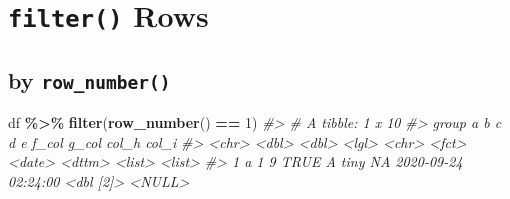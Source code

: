 \documentclass[
]{report}
\newenvironment{Shaded}{\begin{snugshade}}{\end{snugshade}}
\newcommand{\CommentTok}[1]{\textcolor[rgb]{0.56,0.35,0.01}{\textit{#1}}}
\newcommand{\DecValTok}[1]{\textcolor[rgb]{0.00,0.00,0.81}{#1}}
\newcommand{\KeywordTok}[1]{\textcolor[rgb]{0.13,0.29,0.53}{\textbf{#1}}}
\newcommand{\NormalTok}[1]{#1}
\newcommand{\OperatorTok}[1]{\textcolor[rgb]{0.81,0.36,0.00}{\textbf{#1}}}
\newcommand{\StringTok}[1]{\textcolor[rgb]{0.31,0.60,0.02}{#1}}
\begin{document}
\hypertarget{filter-rows}{%
\section{\texorpdfstring{\texttt{filter()} Rows}{filter() Rows}}\label{filter-rows}}

\hypertarget{by-row_number}{%
\subsection{\texorpdfstring{by \texttt{row\_number()}}{by row\_number()}}\label{by-row_number}}

\begin{Shaded}
\begin{Highlighting}[]
\NormalTok{df }\OperatorTok{\%\textgreater{}\%}
\StringTok{  }\KeywordTok{filter}\NormalTok{(}\KeywordTok{row\_number}\NormalTok{() }\OperatorTok{==}\StringTok{ }\DecValTok{1}\NormalTok{)}
\CommentTok{\#\textgreater{} \# A tibble: 1 x 10}
\CommentTok{\#\textgreater{}   group     a     b c     d     e     f\_col      g\_col               col\_h     col\_i }
\CommentTok{\#\textgreater{}   \textless{}chr\textgreater{} \textless{}dbl\textgreater{} \textless{}dbl\textgreater{} \textless{}lgl\textgreater{} \textless{}chr\textgreater{} \textless{}fct\textgreater{} \textless{}date\textgreater{}     \textless{}dttm\textgreater{}              \textless{}list\textgreater{}    \textless{}list\textgreater{}}
\CommentTok{\#\textgreater{} 1 a         1     9 TRUE  A     tiny  NA         2020{-}09{-}24 02:24:00 \textless{}dbl [2]\textgreater{} \textless{}NULL\textgreater{}}
\end{Highlighting}
\end{Shaded}
\end{document}
